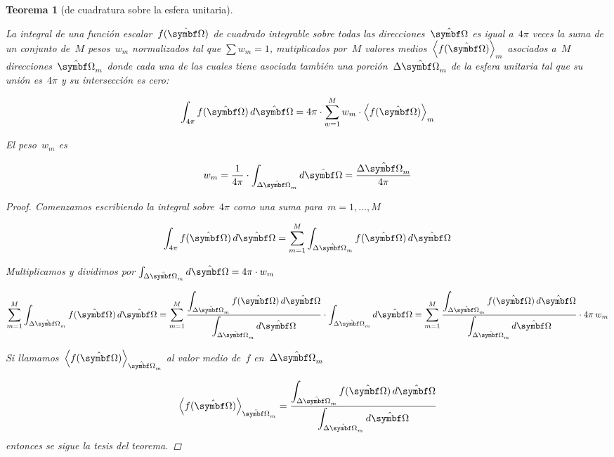 \documentclass[
  12pt,
  a4paper,
  table]{scrbook}
\theoremstyle{plain}
\theoremstyle{definition}
\theoremstyle{plain}
\newtheorem{theorem}{Teorema}[chapter]
\theoremstyle{plain}
\theoremstyle{remark}
\begin{document}
\begin{theorem}[de cuadratura sobre la esfera
unitaria]\protect\hypertarget{thm-cuadratura}{}\label{thm-cuadratura}

La integral de una función escalar~\(f(\omegaversor)\) de cuadrado
integrable sobre todas las direcciones~\(\omegaversor\) es igual
a~\(4\pi\) veces la suma de un conjunto de~\(M\) pesos~\(w_m\)
normalizados tal que \(\sum w_m = 1\), mutiplicados por~\(M\) valores
medios~\(\left\langle f(\omegaversor)\right\rangle_m\) asociados a~\(M\)
direcciones~\(\omegaversor_m\) donde cada una de las cuales tiene
asociada también una porción~\(\Delta \omegaversor_m\) de la esfera
unitaria tal que su unión es~\(4\pi\) y su intersección es cero:

\[
\int_{4\pi} f(\omegaversor) \, d\omegaversor = 4\pi \cdot \sum_{w=1}^M w_m \cdot \left\langle f(\omegaversor)\right\rangle_m
\]

El peso~\(w_m\) es

\[
w_m = \frac{1}{4\pi} \cdot \int_{\Delta \omegaversor_m} d\omegaversor =
\frac{\Delta \omegaversor_m}{4\pi}
\]

\begin{proof}

Comenzamos escribiendo la integral sobre~\(4\pi\) como una suma
para~\(m=1,\dots,M\)

\[
 \int_{4\pi} f(\omegaversor) \, d\omegaversor = \sum_{m=1}^M \int_{\Delta \omegaversor_m} f(\omegaversor) \, d\omegaversor
\]

Multiplicamos y dividimos por
\(\int_{\Delta \omegaversor_m} d\omegaversor = 4\pi \cdot w_m\)

\[
\sum_{m=1}^M \int_{\Delta \omegaversor_m} f(\omegaversor) \, d\omegaversor
= \sum_{m=1}^M \frac{ \displaystyle \int_{\Delta \omegaversor_m} f(\omegaversor) \, d\omegaversor}{ \displaystyle \int_{\Delta \omegaversor_m} d\omegaversor} \cdot \int_{\Delta \omegaversor_m} d\omegaversor
= \sum_{m=1}^M \frac{ \displaystyle \int_{\Delta \omegaversor_m} f(\omegaversor) \, d\omegaversor}{ \displaystyle \int_{\Delta \omegaversor_m} d\omegaversor} \cdot 4\pi \, w_m
\]

Si
llamamos~\(\left\langle f(\omegaversor)\right\rangle_{\omegaversor_m}\)
al valor medio de~\(f\) en~\(\Delta \omegaversor_m\)

\[
\left\langle f(\omegaversor)\right\rangle_{\omegaversor_m} = \frac{ \displaystyle \int_{\Delta \omegaversor_m} f(\omegaversor) \, d\omegaversor}{ \displaystyle \int_{\Delta \omegaversor_m} d\omegaversor}
\] entonces se sigue la tesis del teorema.

\end{proof}

\end{theorem}
\end{document}
